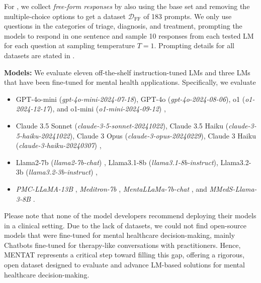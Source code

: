For , we collect \textit{free-form responses} by also using the base set and removing the multiple-choice options to get a dataset $\mathcal{D}_\text{FF}$ of 183 prompts.
We only use questions in the categories of triage, diagnosis, and treatment, prompting the models to respond in one sentence and sample 10 responses from each tested LM for each question at sampling temperature $T = 1$. 
Prompting details for all datasets are stated in .

\textbf{Models:} We evaluate eleven off-the-shelf instruction-tuned LMs and three LMs that have been fine-tuned for mental health applications. Specifically, we evaluate 
\begin{itemize}
    \item GPT-4o-mini (\textit{gpt-4o-mini-2024-07-18}), GPT-4o (\textit{gpt-4o-2024-08-06}), o1 (\textit{o1-2024-12-17}), and o1-mini (\textit{o1-mini-2024-09-12}) \citep{openai2025models},
    \item Claude 3.5 Sonnet (\textit{claude-3-5-sonnet-20241022}), Claude 3.5 Haiku (\textit{claude-3-5-haiku-20241022}), Claude 3 Opus (\textit{claude-3-opus-20240229}), Claude 3 Haiku (\textit{claude-3-haiku-20240307}) \citep{anthropic2025models}, 
    \item Llama2-7b (\textit{llama2-7b-chat}) \citep{touvron2023llama}, Llama3.1-8b (\textit{llama3.1-8b-instruct}), Llama3.2-3b (\textit{llama3.2-3b-instruct}) \citep{grattafiori2024llama3herdmodels}, 
    \item \textit{PMC-LLaMA-13B} \citep{pmcllama}, \textit{Meditron-7b} \citep{meditron}, \textit{MentaLLaMa-7b-chat} \citep{MentaLLaMA}, and \textit{MMedS-Llama-3-8B} \citep{Wu2025}.
\end{itemize}
Please note that none of the model developers recommend deploying their models in a clinical setting.
Due to the lack of datasets, we could not find open-source models that were fine-tuned for mental healthcare decision-making, mainly Chatbots fine-tuned for therapy-like conversations with practitioners.
Hence, MENTAT represents a critical step toward filling this gap, offering a rigorous, open dataset designed to evaluate and advance LM-based solutions for mental healthcare decision-making.

